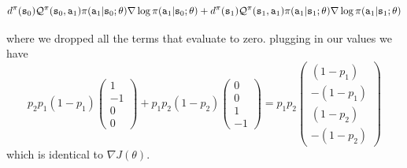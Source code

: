 \begin{example}
\[
d^{\pi}({\tt s}_0)\mathcal{Q}^\pi({\tt s}_0,{\tt a}_1)\pi({\tt a}_1|{\tt s}_0;\theta)
\nabla \log \pi({\tt a}_1|{\tt s}_0;\theta) +
d^{\pi}({\tt s}_1)\mathcal{Q}^\pi({\tt s}_1,{\tt a}_1)\pi({\tt a}_1|{\tt s}_1;\theta)
\nabla \log \pi({\tt a}_1|{\tt s}_1;\theta)
\]

where we dropped all the terms that evaluate to zero. plugging in
our values we have
\[
p_2 p_1 (1-p_1)\begin{pmatrix}1\\-1\\0\\0\end{pmatrix} + p_1 p_2
(1-p_2)\begin{pmatrix}0\\0\\1\\-1\end{pmatrix} = p_1 p_2\begin{pmatrix}(1-p_1)\\
-(1-p_1) \\  (1-p_2) \\ - (1-p_2)\end{pmatrix}
\]
which is identical to $\nabla J(\theta)$.
\end{example}

